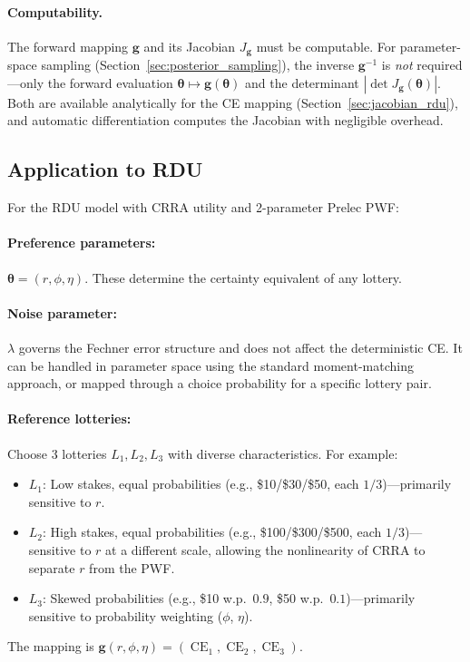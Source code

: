 \documentclass[11pt,a4paper]{article}
\theoremstyle{definition}
\newcommand{\btheta}{\boldsymbol{\theta}}
\DeclareMathOperator{\CE}{CE}
\begin{document}
\paragraph{Computability.} The forward mapping $\mathbf{g}$ and its Jacobian
$J_{\mathbf{g}}$ must be computable. For parameter-space sampling
(Section~\ref{sec:posterior_sampling}), the inverse $\mathbf{g}^{-1}$ is
\emph{not} required---only the forward evaluation
$\btheta \mapsto \mathbf{g}(\btheta)$ and the determinant
$|\det J_{\mathbf{g}}(\btheta)|$. Both are available analytically for the CE
mapping (Section~\ref{sec:jacobian_rdu}), and automatic differentiation
computes the Jacobian with negligible overhead.

\subsection{Application to RDU}
\label{sec:rdu_invertible}

For the RDU model with CRRA utility and 2-parameter Prelec PWF:

\paragraph{Preference parameters:} $\btheta = (r, \phi, \eta)$. These
determine the certainty equivalent of any lottery.

\paragraph{Noise parameter:} $\lambda$ governs the Fechner error structure and
does not affect the deterministic CE. It can be handled in parameter space
using the standard moment-matching approach, or mapped through a choice
probability for a specific lottery pair.

\paragraph{Reference lotteries:} Choose 3 lotteries $L_1, L_2, L_3$ with
diverse characteristics. For example:
\begin{itemize}
    \item $L_1$: Low stakes, equal probabilities (e.g., \$10/\$30/\$50,
        each $1/3$)---primarily sensitive to $r$.
    \item $L_2$: High stakes, equal probabilities (e.g., \$100/\$300/\$500,
        each $1/3$)---sensitive to $r$ at a different scale, allowing the
        nonlinearity of CRRA to separate $r$ from the PWF.
    \item $L_3$: Skewed probabilities (e.g., \$10 w.p.\ $0.9$, \$50 w.p.\
        $0.1$)---primarily sensitive to probability weighting ($\phi$, $\eta$).
\end{itemize}
The mapping is $\mathbf{g}(r, \phi, \eta) = (\CE_1, \CE_2, \CE_3)$.
\end{document}
